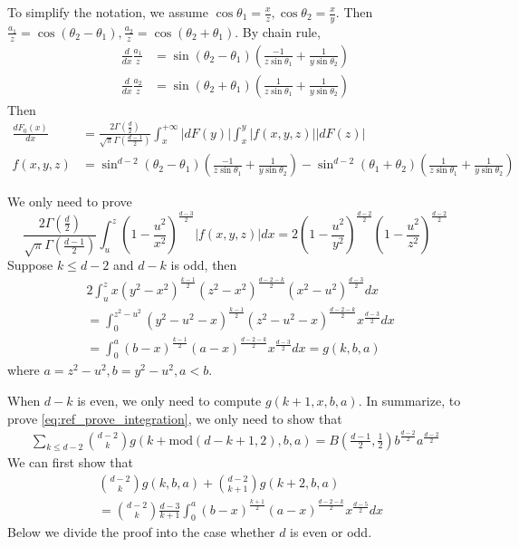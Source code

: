 \documentclass{article}
\begin{document}
To simplify the notation,
we assume $\cos\theta_1=\frac{x}{z},
\cos\theta_2=\frac{x}{y}$.
Then $\frac{a_1}{z} = \cos(\theta_2 - \theta_1),
\frac{a_2}{z} = \cos(\theta_2+\theta_1)$.
By chain rule,
\begin{align*}
    \frac{d}{dx}\frac{a_1}{z} &
    = \sin(\theta_2 - \theta_1)
    \left(\frac{-1}{z\sin\theta_1}
    +\frac{1}{y\sin \theta_2}\right)\\
    \frac{d}{dx}\frac{a_2}{z} &
    = \sin(\theta_2 + \theta_1)
    \left(\frac{1}{z\sin\theta_1}
    +\frac{1}{y\sin \theta_2}\right)
\end{align*}
Then
\begin{align*}
    \frac{d F_0(x)}{dx} & =\frac{2\Gamma(\frac{d}{2})}
    {\sqrt{\pi}\Gamma(\frac{d-1}{2})}
    \int_x^{+\infty} |dF(y)| \int_x^y |f(x,y,z)| |dF(z)| \\
    f(x,y,z) & = \sin^{d-2} (\theta_2 - \theta_1)
    \left(\frac{-1}{z\sin\theta_1}
    +\frac{1}{y\sin \theta_2}\right)
    - \sin^{d-2}(\theta_1 + \theta_2)
    \left(\frac{1}{z\sin\theta_1}
    +\frac{1}{y\sin \theta_2}\right)
\end{align*}


We only need to prove
\begin{equation}\label{eq:ref_prove_integration}    
    \frac{2\Gamma(\frac{d}{2})}
    {\sqrt{\pi}\Gamma(\frac{d-1}{2})}
    \int_u^z (1-\frac{u^2}{x^2})^{\frac{d-3}{2}}
    |f(x,y,z)|dx =
    2(1-\frac{u^2}{y^2})^{\frac{d-2}{2}}
    (1-\frac{u^2}{z^2})^{\frac{d-2}{2}}
\end{equation} 
Suppose $k\leq d-2$ and $d-k$ is odd,
then
\begin{align*}
    &2\int_u^z x
    (y^2-x^2)^{\frac{k-1}{2}}
    (z^2-x^2)^{\frac{d-2-k}{2}}
    (x^2-u^2)^{\frac{d-3}{2}}dx\\
    &=\int_{0}^{z^2-u^2}
    (y^2-u^2-x)^{\frac{k-1}{2}}
    (z^2-u^2-x)^{\frac{d-2-k}{2}}
    x^{\frac{d-3}{2}}dx\\
    &=\int_{0}^{a}
    (b-x)^{\frac{k-1}{2}}
    (a-x)^{\frac{d-2-k}{2}}
    x^{\frac{d-3}{2}}dx=g(k,b,a)
\end{align*}
where $a=z^2-u^2, b=y^2-u^2, a<b$.

When $d-k$ is even, we only need to compute
$g(k+1,x,b,a)$.
In summarize, to prove \eqref{eq:ref_prove_integration},
we only need to show that
\begin{align}\label{eq:intermediate_summation}
    \sum_{k\leq d-2}\binom{d-2}{k}g(k+\textrm{mod}(d-k+1,2)
    ,b,a)
    = B(\frac{d-1}{2}, \frac{1}{2})
    b^{\frac{d-2}{2}}
    a^{\frac{d-2}{2}}
\end{align}
We can first show that
\begin{align*}
    &\binom{d-2}{k}
    g(k,b,a) + \binom{d-2}{k+1}
    g(k+2,b,a) \\
    &=\binom{d-2}{k}\frac{d-3}{k+1}
    \int_{0}^{a}
    (b-x)^{\frac{k+1}{2}}
    (a-x)^{\frac{d-2-k}{2}}
    x^{\frac{d-5}{2}}dx
\end{align*}
Below we divide the proof into the case whether
$d$ is even or odd.
\end{document}
